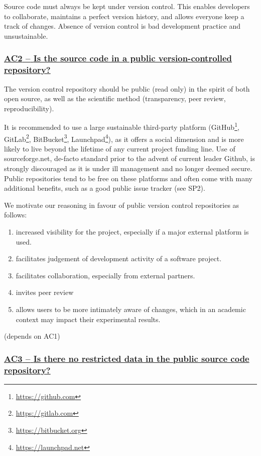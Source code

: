 \documentclass[a4paper,11pt]{article}
\newcommand{\indicator}[1]{\subsubsection*{\underline{#1}}}
\begin{document}
Source code must always be kept under version control. This enables developers
to collaborate, maintains a perfect version history, and allows everyone keep a
track of changes. Absence of version control is bad development practice and
unsustainable.

\newcommand{\acTwoName}{AC2}
\newcommand{\acTwoID}{\acTwoName}
\newcommand{\acTwoText}{Is the source code in a public version-controlled repository?}
\indicator{\acTwoName{ }--{ }\acTwoText}\label{id:ac2} 

The version control repository should be public (read only) in the spirit of both open
source, as well as the scientific method (transparency, peer review,
reproducibility). 

It is recommended to use a large sustainable third-party platform
(GitHub\footnote{\url{https://github.com}},
GitLab\footnote{\url{https://gitlab.com}},
BitBucket\footnote{\url{https://bitbucket.org}},
Launchpad\footnote{\url{https://launchpad.net}}), as it offers a social
dimension and is more likely to live beyond the lifetime of any current project
funding line. Use of sourceforge.net, de-facto standard prior to the advent of
current leader Github, is strongly discouraged as it is under ill management
and no longer deemed secure. Public repositories tend to be free on these platforms and
often come with many additional benefits, such as a good public issue tracker
(see SP2).

We motivate our reasoning in favour of public version control repositories as follows:

\begin{enumerate}
    \item increased visibility for the project, especially if a major external platform is used.
    \item facilitates judgement of development activity of a software project.
    \item facilitates collaboration, especially from external partners.
    \item invites peer review
    \item allows users to be more intimately aware of changes, which in an
        academic context may impact their experimental results.
\end{enumerate}

(depends on AC1)

\newcommand{\acThreeName}{AC3}
\newcommand{\acThreeID}{\acThreeName}
\newcommand{\acThreeText}{Is there no restricted data in the public source code repository?}
\indicator{\acThreeName{ }--{ }\acThreeText}\label{id:ac3} 
\end{document}
